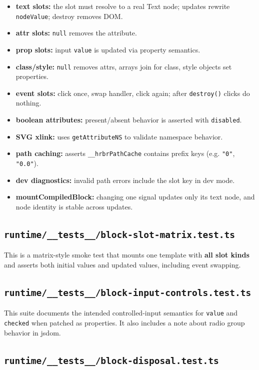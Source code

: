 \begin{itemize}
  \item \textbf{text slots:} the slot must resolve to a real Text node; updates rewrite \texttt{nodeValue}; destroy removes DOM.
  \item \textbf{attr slots:} \texttt{null} removes the attribute.
  \item \textbf{prop slots:} input \texttt{value} is updated via property semantics.
  \item \textbf{class/style:} \texttt{null} removes attrs, arrays join for class, style objects set properties.
  \item \textbf{event slots:} click once, swap handler, click again; after \texttt{destroy()} clicks do nothing.
  \item \textbf{boolean attributes:} present/absent behavior is asserted with \texttt{disabled}.
  \item \textbf{SVG xlink:} uses \texttt{getAttributeNS} to validate namespace behavior.
  \item \textbf{path caching:} asserts \texttt{\_\_hrbrPathCache} contains prefix keys (e.g. \texttt{"0"}, \texttt{"0.0"}).
  \item \textbf{dev diagnostics:} invalid path errors include the slot key in dev mode.
  \item \textbf{mountCompiledBlock:} changing one signal updates only its text node, and node identity is stable across updates.
\end{itemize}

\subsection{\texttt{runtime/\_\_tests\_\_/block-slot-matrix.test.ts}}

This is a matrix-style smoke test that mounts one template with \textbf{all slot kinds} and asserts both initial values and updated values, including event swapping.

\subsection{\texttt{runtime/\_\_tests\_\_/block-input-controls.test.ts}}

This suite documents the intended controlled-input semantics for \texttt{value} and \texttt{checked} when patched as properties.
It also includes a note about radio group behavior in jsdom.

\subsection{\texttt{runtime/\_\_tests\_\_/block-disposal.test.ts}}

